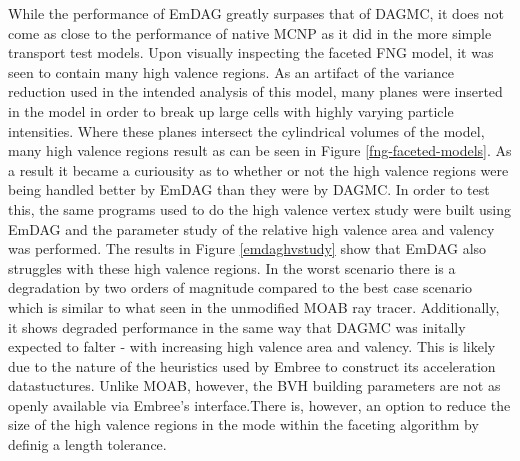 \documentclass[12pt, a4paper]{article}
\begin{document}
While the performance of EmDAG greatly surpases that of DAGMC, it does not come as close to the performance of native MCNP as it did in the more simple transport test models. Upon visually inspecting the faceted FNG model, it was seen to contain many high valence regions. As an artifact of the variance reduction used in the intended analysis of this model, many planes were inserted in the model in order to break up large cells with highly varying particle intensities. Where these planes intersect the cylindrical volumes of the model, many high valence regions result as can be seen in Figure \ref{fng-faceted-models}. As a result it became a curiousity as to whether or not the high valence regions were being handled better by EmDAG than they were by DAGMC. In order to test this, the same programs used to do the high valence vertex study were built using EmDAG and the parameter study of the relative high valence area and valency was performed. The results in Figure \ref{emdaghvstudy} show that EmDAG also struggles with these high valence regions. In the worst scenario there is a degradation by two orders of magnitude compared to the best case scenario which is similar to what seen in the unmodified MOAB ray tracer. Additionally, it shows degraded performance in the same way that DAGMC was initally expected to falter - with increasing high valence area and valency. This is likely due to the nature of the heuristics used by Embree to construct its acceleration datastuctures.  Unlike MOAB, however, the BVH building parameters are not as openly available via Embree's interface.There is, however, an option to reduce the size of the high valence regions in the mode within the faceting algorithm by definig a length tolerance.
\end{document}
